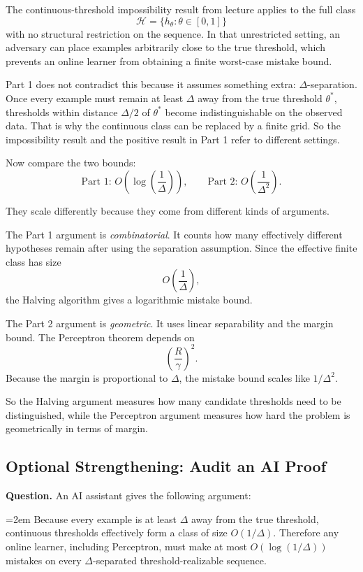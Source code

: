 \documentclass{article}
\begin{document}
\begin{solutionbox}

The continuous-threshold impossibility result from lecture applies to the full
class
\[
\mathcal{H}=\{h_\theta:\theta\in[0,1]\}
\]
with no structural restriction on the sequence. In that unrestricted setting,
an adversary can place examples arbitrarily close to the true threshold, which
prevents an online learner from obtaining a finite worst-case mistake bound.

Part 1 does not contradict this because it assumes something extra:
$\Delta$-separation. Once every example must remain at least $\Delta$ away from
the true threshold $\theta^*$, thresholds within distance $\Delta/2$ of
$\theta^*$ become indistinguishable on the observed data. That is why the
continuous class can be replaced by a finite grid. So the impossibility result
and the positive result in Part 1 refer to different settings.

Now compare the two bounds:
\[
\text{Part 1: } O\!\left(\log\left(\frac{1}{\Delta}\right)\right),
\qquad
\text{Part 2: } O\!\left(\frac{1}{\Delta^2}\right).
\]

They scale differently because they come from different kinds of arguments.

The Part 1 argument is \emph{combinatorial}. It counts how many effectively
different hypotheses remain after using the separation assumption. Since the
effective finite class has size
\[
O\!\left(\frac{1}{\Delta}\right),
\]
the Halving algorithm gives a logarithmic mistake bound.

The Part 2 argument is \emph{geometric}. It uses linear separability and the
margin bound. The Perceptron theorem depends on
\[
\left(\frac{R}{\gamma}\right)^2.
\]
Because the margin is proportional to $\Delta$, the mistake bound scales like
$1/\Delta^2$.

So the Halving argument measures how many candidate thresholds need to be
distinguished, while the Perceptron argument measures how hard the problem is
geometrically in terms of margin.

\end{solutionbox}

\subsection{Optional Strengthening: Audit an AI Proof}
\textbf{Question.}
An AI assistant gives the following argument:

\hangindent=2em
Because every example is at least $\Delta$ away from the true threshold, continuous thresholds effectively form a class of size $O(1/\Delta)$. Therefore any online learner, including Perceptron, must make at most $O(\log(1/\Delta))$ mistakes on every $\Delta$-separated threshold-realizable sequence.
\end{document}
